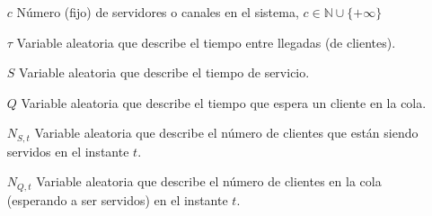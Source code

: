 \documentclass[a4paper,10pt]{scrartcl}
\theoremstyle{definition}
\numberwithin{equation}{section}
\begin{document}
\begin{itemize}
\item [$c$]
  Número (fijo) de servidores o canales en el sistema, $c\in \mathbb{N} \cup \{+\infty\}$
\item [$\tau$]
  Variable aleatoria que describe el tiempo entre llegadas (de clientes).
\item [$S$]
  Variable aleatoria que describe el tiempo de servicio.
\item [$Q$]
  Variable aleatoria que describe el tiempo que espera un cliente en la cola.
\item [$N_{S,t}$]
  Variable aleatoria que describe el número de clientes que están siendo servidos en el instante $t$.
\item [$N_{Q,t}$]
  Variable aleatoria que describe el número de clientes en la cola (esperando a ser servidos) en el instante $t$.
\end{itemize}

\end{document}
